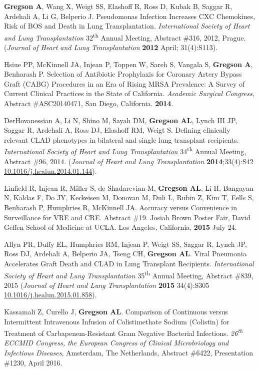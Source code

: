 \documentclass[letterpaper,11pt,sans,final]{moderncv}%
\begin{document}
\begin{thebibliography}{1}
\bibitem[11]{} \textbf{Gregson A}, Wang X, Weigt SS, Elashoff R, Ross D, Kubak B, Saggar R, Ardehali A, Li G, Belperio J. Pseudomonas Infection Increases {\smaller CXC} Chemokines, Risk of {\smaller BOS} and Death in Lung Transplantation. \textit{International Society of Heart and Lung Transplantation} 32\textsuperscript{th} Annual Meeting, Abstract \#316, 2012, Prague. (\textit{Journal of Heart and Lung Transplantation} \textbf{2012} April; 31(4):S113).

\bibitem[12]{} Hsiue PP, McKinnell JA, Injean P, Toppen W, Sareh S, Vangala S, \textbf{Gregson A}, Benharash P. Selection of Antibiotic Prophylaxis for Coronary Artery Bypass Graft ({\smaller CABG}) Procedures in an Era of Rising {\smaller MRSA} Prevalence: A Survey of Current Clinical Practices in the State of California. \textit{Academic Surgical Congress}, Abstract \#ASC20140471, San Diego, California. \textbf{2014}. 

\bibitem[13]{} DerHovanessian A, Li N, Shino M, Sayah DM, \textbf{Gregson AL}, Lynch III JP, Saggar R, Ardehali A, Ross DJ, Elashoff RM, Weigt S. Defining clinically
relevant CLAD phenotypes in bilateral and single lung transplant recipients. \textit{International Society of Heart and Lung Transplantation} 34\textsuperscript{th} Annual Meeting, Abstract \#96, 2014. (\textit{Journal of Heart and Lung Transplantation} \textbf{2014};33(4):S42 \href{http://dx.doi.org/10.1016/j.healun.2014.01.144}{\url{10.1016/j.healun.2014.01.144}}).

\bibitem[14]{} Linfield R, Injean R, Miller S, de Shadarevian M, \textbf{Gregson AL}, Li H, Bangayan N, Kaldas F, Do JY, Keckeisen M, Donovan M, Duli L, Rubin Z, Kim T, Eells S, Benharash P, Humphries R, McKinnell JA. Accuracy versus Convenience in Surveillance for {\smaller VRE} and {\smaller CRE}. Abstract \#19. Josiah Brown Poster Fair, David Geffen School of Medicine at {\smaller UCLA}. Los Angeles, California, \textbf{2015} July 24.

\bibitem[15]{} Allyn PR, Duffy EL, Humphries RM, Injean P, Weigt SS, Saggar R, Lynch JP, Ross DJ, Ardehali A, Belperio JA, Tseng CH, \textbf{Gregson AL}. Viral Pneumonia Accelerates Graft Death and CLAD in Lung Transplant Recipients. \textit{International Society of Heart and Lung Transplantation} 35\textsuperscript{th} Annual Meeting, Abstract \#839, 2015 (\textit{Journal of Heart and Lung Transplantation} \textbf{2015} 34(4):S305 \href{http://dx.doi.org/10.1016/j.healun.2015.01.858}{\url{10.1016/j.healun.2015.01.858}}).

\bibitem[16]{} Kassamali Z, Curello J, \textbf{Gregson AL}. Comparison of Continuous versus Intermittent Intravenous Infusion of Colistimethate Sodium (Colistin) for Treatment of Carbapenem-Resistant Gram Negative Bacterial Infections. \textit{26\textsuperscript{th} {\smaller ECCMID} Congress, the European Congress of Clinical Microbriology and Infectious Diseases}, Amsterdam, The Netherlands, Abstract \#6422, Presentation \#1230, April 2016.


\end{thebibliography}
\end{document}

